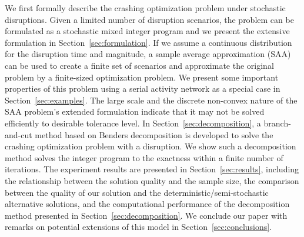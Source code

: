 \documentclass[11pt]{article}
\begin{document}
	\newline
	We first formally describe the crashing optimization problem under stochastic disruptions. Given a limited number of disruption scenarios, the problem can be formulated as a stochastic mixed integer program and we present the extensive formulation in Section~\ref{sec:formulation}. If we assume a continuous distribution for the disruption time and magnitude, a sample average approximation (SAA) can be used to create a finite set of scenarios and approximate the original problem by a finite-sized optimization problem. We present some important properties of this problem using a serial activity network as a special case in Section~\ref{sec:examples}. The large scale and the discrete non-convex nature of the SAA problem's extended formulation indicate that it may not be solved efficiently to desirable tolerance level. In Section~\ref{sec:decomposition}, a branch-and-cut method based on Benders decomposition is developed to solve the crashing optimization problem with a disruption. We show such a decomposition method solves the integer program to the exactness within a finite number of iterations. The experiment results are presented in Section~\ref{sec:results}, including the relationship between the solution quality and the sample size, the comparison between the quality of our solution and the deterministic/semi-stochastic alternative solutions, and the computational performance of the decomposition method presented in Section~\ref{sec:decomposition}. We conclude our paper with remarks on potential extensions of this model in Section~\ref{sec:conclusions}.
	
\end{document}
